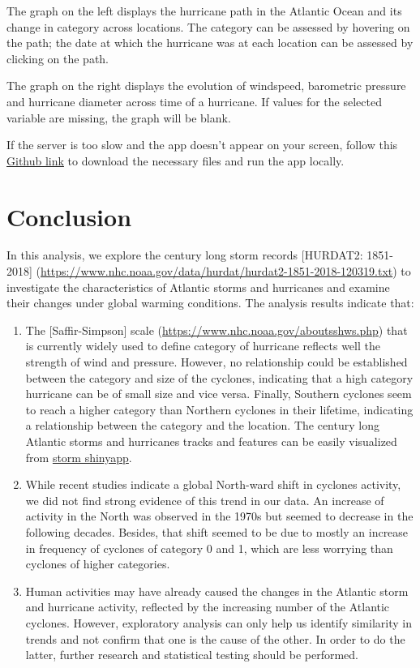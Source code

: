 \documentclass[]{book}
\begin{document}
The graph on the left displays the hurricane path in the Atlantic Ocean and its change in category across locations. The category can be assessed by hovering on the path; the date at which the hurricane was at each location can be assessed by clicking on the path.

The graph on the right displays the evolution of windspeed, barometric pressure and hurricane diameter across time of a hurricane. If values for the selected variable are missing, the graph will be blank.

If the server is too slow and the app doesn't appear on your screen, follow this \href{https://github.com/jqz300/edav_proj}{Github link} to download the necessary files and run the app locally.

\hypertarget{conclusion}{%
\chapter{Conclusion}\label{conclusion}}

In this analysis, we explore the century long storm records {[}HURDAT2: 1851-2018{]} (\url{https://www.nhc.noaa.gov/data/hurdat/hurdat2-1851-2018-120319.txt}) to investigate the characteristics of Atlantic storms and hurricanes and examine their changes under global warming conditions. The analysis results indicate that:

\begin{enumerate}
\def\labelenumi{(\arabic{enumi})}
\item
  The {[}Saffir-Simpson{]} scale (\url{https://www.nhc.noaa.gov/aboutsshws.php}) that is currently widely used to define category of hurricane reflects well the strength of wind and pressure. However, no relationship could be established between the category and size of the cyclones, indicating that a high category hurricane can be of small size and vice versa. Finally, Southern cyclones seem to reach a higher category than Northern cyclones in their lifetime, indicating a relationship between the category and the location. The century long Atlantic storms and hurricanes tracks and features can be easily visualized from \href{https://hurricane.shinyapps.io/shinyapp/}{storm shinyapp}.
\item
  While recent studies indicate a global North-ward shift in cyclones activity, we did not find strong evidence of this trend in our data. An increase of activity in the North was observed in the 1970s but seemed to decrease in the following decades. Besides, that shift seemed to be due to mostly an increase in frequency of cyclones of category 0 and 1, which are less worrying than cyclones of higher categories.
\item
  Human activities may have already caused the changes in the Atlantic storm and hurricane activity, reflected by the increasing number of the Atlantic cyclones. However, exploratory analysis can only help us identify similarity in trends and not confirm that one is the cause of the other. In order to do the latter, further research and statistical testing should be performed.
\end{enumerate}


\end{document}
